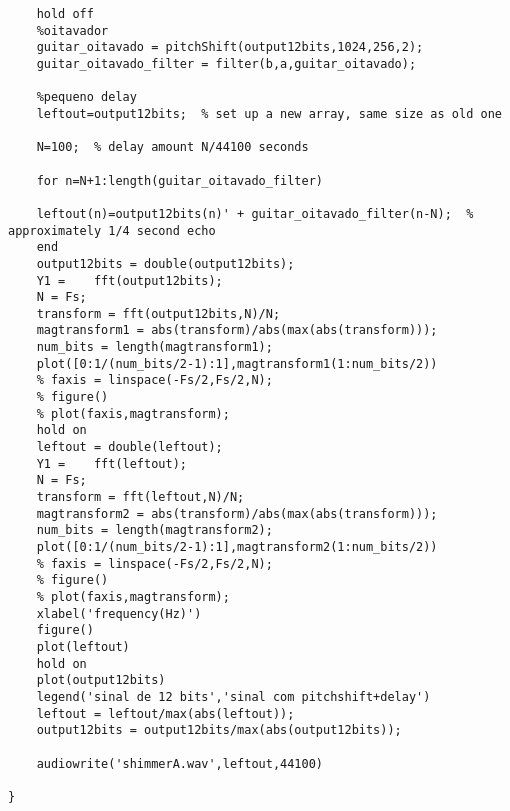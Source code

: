 \begin{lstlisting}
	hold off
	%oitavador
	guitar_oitavado = pitchShift(output12bits,1024,256,2);
	guitar_oitavado_filter = filter(b,a,guitar_oitavado);
	
	%pequeno delay
	leftout=output12bits;  % set up a new array, same size as old one
	
	N=100;  % delay amount N/44100 seconds
	
	for n=N+1:length(guitar_oitavado_filter)
	
	leftout(n)=output12bits(n)' + guitar_oitavado_filter(n-N);  % approximately 1/4 second echo
	end
	output12bits = double(output12bits);
	Y1 =    fft(output12bits);
	N = Fs;
	transform = fft(output12bits,N)/N;
	magtransform1 = abs(transform)/abs(max(abs(transform)));
	num_bits = length(magtransform1);
	plot([0:1/(num_bits/2-1):1],magtransform1(1:num_bits/2))
	% faxis = linspace(-Fs/2,Fs/2,N);
	% figure()
	% plot(faxis,magtransform);
	hold on
	leftout = double(leftout);
	Y1 =    fft(leftout);
	N = Fs;
	transform = fft(leftout,N)/N;
	magtransform2 = abs(transform)/abs(max(abs(transform)));
	num_bits = length(magtransform2);
	plot([0:1/(num_bits/2-1):1],magtransform2(1:num_bits/2))
	% faxis = linspace(-Fs/2,Fs/2,N);
	% figure()
	% plot(faxis,magtransform);
	xlabel('frequency(Hz)')
	figure()
	plot(leftout)
	hold on
	plot(output12bits)
	legend('sinal de 12 bits','sinal com pitchshift+delay')
	leftout = leftout/max(abs(leftout));
	output12bits = output12bits/max(abs(output12bits));
	
	audiowrite('shimmerA.wav',leftout,44100)

}
\end{lstlisting}
